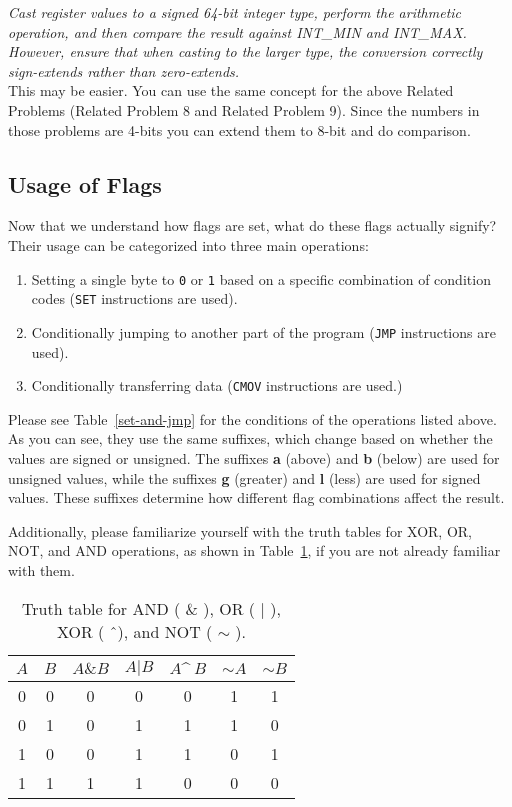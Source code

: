\documentclass{article}
\begin{document}
\textit{Cast register values to a signed 64-bit integer type, perform the arithmetic operation, and then compare the result against INT\_MIN and INT\_MAX. However, ensure that when casting to the larger type, the conversion correctly sign-extends rather than zero-extends.} \\

This may be easier. You can use the same concept for the above Related Problems (Related Problem 8 and Related Problem 9). Since the numbers in those problems are 4-bits you can extend them to 8-bit and do comparison. \\
\clearpage
\subsection{Usage of Flags}

Now that we understand how flags are set, what do these flags actually signify? Their usage can be categorized into three main operations:

\begin{enumerate}
    \item Setting a single byte to \texttt{0} or \texttt{1} based on a specific combination of condition codes (\texttt{SET} instructions are used).
    \item Conditionally jumping to another part of the program (\texttt{JMP} instructions are used).
    \item Conditionally transferring data (\texttt{CMOV} instructions are used.)
\end{enumerate}
Please see Table~\ref{set-and-jmp} for the conditions of the operations listed above. As you can see, they use the same suffixes, which change based on whether the values are signed or unsigned. The suffixes \textbf{a} (above) and \textbf{b} (below) are used for unsigned values, while the suffixes \textbf{g} (greater) and \textbf{l} (less) are used for signed values. These suffixes determine how different flag combinations affect the result. 

Additionally, please familiarize yourself with the truth tables for XOR, OR, NOT, and AND operations, as shown in Table~\ref{truth-table}, if you are not already familiar with them.

\begin{table}[h]
    \centering
    \small
    \renewcommand{\arraystretch}{1.2}
    \begin{tabular}{c c | c c c c c}
        \toprule
        $A$ & $B$ & $A \& B$ & $A | B$ & $A \^\ B$ & $\sim A$ & $\sim B$ \\
        \midrule
        0 & 0 & 0 & 0 & 0 & 1 & 1 \\
        0 & 1 & 0 & 1 & 1 & 1 & 0 \\
        1 & 0 & 0 & 1 & 1 & 0 & 1 \\
        1 & 1 & 1 & 1 & 0 & 0 & 0 \\
        \bottomrule
    \end{tabular}
    \caption{Truth table for AND ( $\&$ ), OR ( $|$ ), XOR ( \^\ ), and NOT ( $\sim$ ).}
    \label{truth-table}
\end{table}
\end{document}
